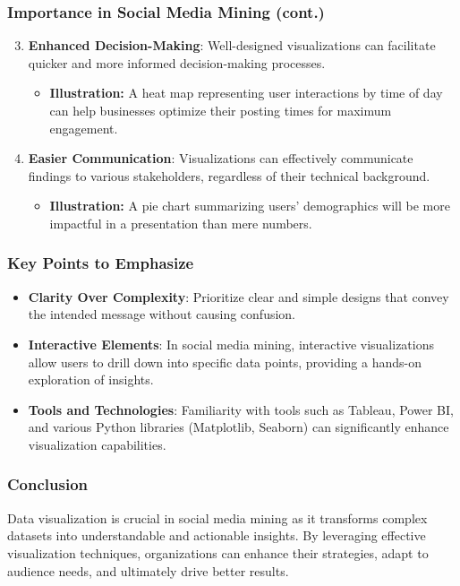 \documentclass{beamer}
\begin{document}
\begin{frame}[fragile]
    \frametitle{Importance in Social Media Mining (cont.)}
    \begin{enumerate}
        \setcounter{enumii}{2} %
        \item \textbf{Enhanced Decision-Making}: Well-designed visualizations can facilitate quicker and more informed decision-making processes.
        \begin{itemize}
            \item \textbf{Illustration:} A heat map representing user interactions by time of day can help businesses optimize their posting times for maximum engagement.
        \end{itemize}
        
        \item \textbf{Easier Communication}: Visualizations can effectively communicate findings to various stakeholders, regardless of their technical background.
        \begin{itemize}
            \item \textbf{Illustration:} A pie chart summarizing users’ demographics will be more impactful in a presentation than mere numbers.
        \end{itemize}
    \end{enumerate}
\end{frame}

\begin{frame}[fragile]
    \frametitle{Key Points to Emphasize}
    \begin{itemize}
        \item \textbf{Clarity Over Complexity}: Prioritize clear and simple designs that convey the intended message without causing confusion.
        \item \textbf{Interactive Elements}: In social media mining, interactive visualizations allow users to drill down into specific data points, providing a hands-on exploration of insights.
        \item \textbf{Tools and Technologies}: Familiarity with tools such as Tableau, Power BI, and various Python libraries (Matplotlib, Seaborn) can significantly enhance visualization capabilities.
    \end{itemize}
\end{frame}

\begin{frame}[fragile]
    \frametitle{Conclusion}
    Data visualization is crucial in social media mining as it transforms complex datasets into understandable and actionable insights. By leveraging effective visualization techniques, organizations can enhance their strategies, adapt to audience needs, and ultimately drive better results.
\end{frame}
\end{document}
